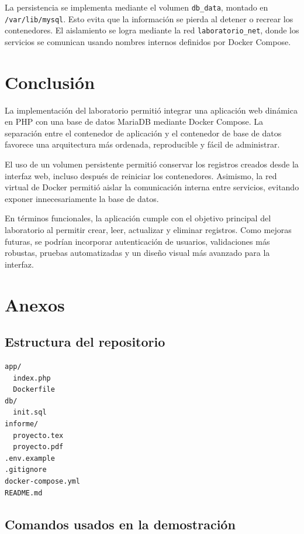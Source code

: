 \documentclass[12pt]{article}
\begin{document}
La persistencia se implementa mediante el volumen \texttt{db\_data}, montado en \texttt{/var/lib/mysql}. Esto evita que la información se pierda al detener o recrear los contenedores. El aislamiento se logra mediante la red \texttt{laboratorio\_net}, donde los servicios se comunican usando nombres internos definidos por Docker Compose.

\section{Conclusión}

La implementación del laboratorio permitió integrar una aplicación web dinámica en PHP con una base de datos MariaDB mediante Docker Compose. La separación entre el contenedor de aplicación y el contenedor de base de datos favorece una arquitectura más ordenada, reproducible y fácil de administrar.

El uso de un volumen persistente permitió conservar los registros creados desde la interfaz web, incluso después de reiniciar los contenedores. Asimismo, la red virtual de Docker permitió aislar la comunicación interna entre servicios, evitando exponer innecesariamente la base de datos.

En términos funcionales, la aplicación cumple con el objetivo principal del laboratorio al permitir crear, leer, actualizar y eliminar registros. Como mejoras futuras, se podrían incorporar autenticación de usuarios, validaciones más robustas, pruebas automatizadas y un diseño visual más avanzado para la interfaz.

\appendix
\section{Anexos}

\subsection{Estructura del repositorio}

\begin{verbatim}
app/
  index.php
  Dockerfile
db/
  init.sql
informe/
  proyecto.tex
  proyecto.pdf
.env.example
.gitignore
docker-compose.yml
README.md
\end{verbatim}

\subsection{Comandos usados en la demostración}
\end{document}
